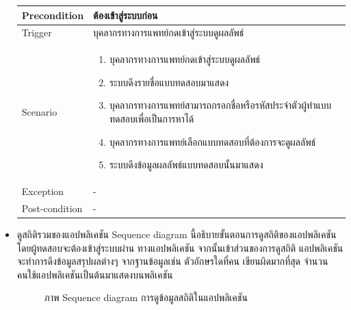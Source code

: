 \documentclass[12pt,oneside,openright,a4paper]{cpe-thai-project}
\begin{document}
\begin{itemize}
\begin{table}[!h]
\begin{tabular}{|p{3cm}|p{12cm}|}
      Precondition & ต้องเข้าสู่ระบบก่อน \\ \hline
      Trigger & บุคลากรทางการแพทย์กดเข้าสู่ระบบดูผลลัพธ์ \\ \hline
      Scenario & \begin{enumerate}
        \item บุคลากรทางการแพทย์กดเข้าสู่ระบบดูผลลัพธ์
        \item ระบบดึงรายชื่อแบบทดสอบมาแสดง
        \item บุคลากรทางการแพทย์สามารถกรอกชื่อหรือรหัสประจำตัวผู้ทำแบบทดสอบเพื่อเป็นการหาได้ 
        \item บุคลากรทางการแพทย์เลือกแบบทดสอบที่ต้องการจะดูผลลัพธ์
        \item ระบบดึงข้อมูลผลลัพธ์แบบทดสอบนั้นมาแสดง 
      \end{enumerate} \\ \hline
      Exception & - \\ \hline
      Post-condition & - \\ \hline
      \end{tabular}
      \end{table}
     \newpage
    \item ดูสถิติรวมของแอปพลิเคชัน
    Sequence diagram นี้อธิบายขั้นตอนการดูสถิติของแอปพลิเคชันโดยผู้ทดสอบจะต้องเข้าสู่ระบบผ่าน ทางแอปพลิเคชัน จากนั้นเข้าส่วนของการดูสถิติ
     แอปพลิเคชันจะทำการดึงข้อมูลสรุปผลต่างๆ จากฐานข้อมูลเช่น ตัวอักษรใดที่คน เขียนผิดมากที่สุด จำนวนคนใช้แอปพลิเคชันเป็นต้นมาแสดงบนพลิเคชัน
    \begin{figure}[!ht]\centering
      \setlength{\fboxrule}{0.2mm} %
      \setlength{\fboxsep}{1cm}
      \caption{ภาพ Sequence diagram การดูข้อมูลสถิติในแอปพลิเคชัน}\label{fig:activity3}

\end{figure}
\end{itemize}
\end{document}
